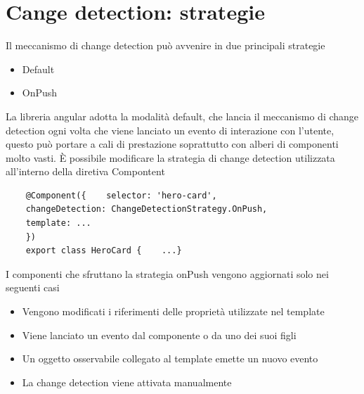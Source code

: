 
\section{Cange detection: strategie}
Il meccanismo di change detection può avvenire in due principali strategie
\begin{itemize}
    \item Default
    \item OnPush
\end{itemize}
La libreria angular adotta la modalità default, che lancia il meccanismo di change detection ogni volta che viene lanciato un evento di interazione con l'utente, questo può portare a cali di prestazione soprattutto con alberi di componenti molto vasti.
È possibile modificare la strategia di change detection utilizzata all'interno della diretiva Compontent
\begin{verbatim}
    @Component({    selector: 'hero-card',    
    changeDetection: ChangeDetectionStrategy.OnPush,    
    template: ...
    })
    export class HeroCard {    ...}
\end{verbatim}
I componenti che sfruttano la strategia onPush vengono aggiornati solo nei seguenti casi
\begin{itemize}
    \item Vengono modificati i riferimenti delle proprietà utilizzate nel template
    \item Viene lanciato un evento dal componente o da uno dei suoi figli 
    \item Un oggetto osservabile collegato al template emette un nuovo evento
    \item La change detection viene attivata manualmente
\end{itemize}

